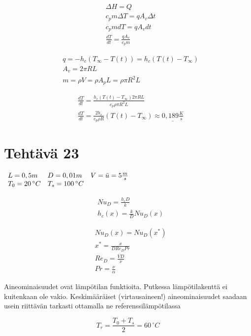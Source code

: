 \documentclass[12pt,a4paper,finnish]{article}
\begin{document}
\begin{align}
 &\Delta H = Q\\
 &c_pm\Delta T = qA_v\Delta t\\
 &c_pmdT = qA_v dt\\
 &\frac{dT}{dt} = \frac{qA_v}{c_pm}
\end{align}

\begin{align}
 &q = -h_c(T_{\infty} - T(t)) = h_c(T(t) - T_{\infty})\\
 &A_v = 2\pi RL\\
 &m = \rho V = \rho A_pL = \rho \pi R^2 L
\end{align}

\begin{align}
 &\frac{dT}{dt} = \frac{h_c(T(t) - T_{\infty})2\pi RL}{c_p\rho \pi R^2 L}\\
 &\frac{dT}{dt} = \frac{2h_c}{c_p\rho R}(T(t) - T_{\infty}) \approx \underline{0,189 \frac{K}{s}}
\end{align}

\section{Tehtävä 23}

\begin{math}
 \begin{array}{l l l}
  L = 0,5m & D = 0,01m & V = \bar{u} = 5 \frac{m}{s}\\
  T_0 = 20\,^{\circ}C & T_s = 100\,^{\circ}C
 \end{array}
\end{math}

\begin{align}
 &Nu_D = \frac{h_cD}{k}\\
 &h_c(x) = \frac{k}{D}Nu_D(x)
\end{align}

\begin{align}
 &Nu_D(x) = Nu_D(x^*)\\
 &x^* = \frac{x}{DRe_DPr}\\
 &Re_D = \frac{VD}{\nu}\\
 &Pr = \frac{\nu}{\alpha}
\end{align}

Aineominaisuudet ovat lämpötilan funktioita. Putkessa lämpötilakenttä ei kuitenkaan ole vakio. 
Keskimääräiset (virtausaineen!) aineominaisuudet saadaan usein riittävän tarkasti ottamalla ne 
referenssilämpötilassa 

\begin{equation}
 T_r = \frac{T_0 + T_s}{2} = 60\,^{\circ}C
\end{equation}
\end{document}
